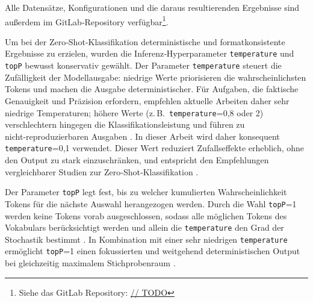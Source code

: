 Alle Datensätze, Konfigurationen und die daraus resultierenden
Ergebnisse sind außerdem im GitLab‑Repository verfügbar\footnote{Siehe das GitLab Repository: \hyperlink{https://gitlab.com/andreaskonrad/bpmn-gdpr-llm-evaluation}{// TODO}}.

Um bei der Zero‑Shot‑Klassifikation deterministische und formatkonsistente Ergebnisse zu erzielen, wurden die Inferenz‑Hyperparameter \texttt{temperature} und \texttt{topP} bewusst konservativ gewählt. Der Parameter \texttt{temperature} steuert die Zufälligkeit der Modellausgabe: niedrige Werte priorisieren die wahrscheinlichsten Tokens und machen die Ausgabe deterministischer. Für Aufgaben, die faktische Genauigkeit und Präzision erfordern, empfehlen aktuelle Arbeiten daher sehr niedrige Temperaturen; höhere Werte (z.\,B.\ \texttt{temperature}=0{,}8 oder 2) verschlechtern hingegen die Klassifikationsleistung und führen zu nicht‑reproduzierbaren Ausgaben \cite{renze2024effect,mu2024navigating}.
In dieser Arbeit wird daher konsequent \texttt{temperature}=0{,}1 verwendet. Dieser Wert reduziert Zufallseffekte erheblich, ohne den Output zu stark einzuschränken, und entspricht den Empfehlungen vergleichbarer Studien zur Zero‑Shot‑Klassifikation \cite{mu2024navigating}.

Der Parameter \texttt{topP} legt fest, bis zu welcher kumulierten Wahrscheinlichkeit Tokens für die nächste Auswahl herangezogen werden. Durch die Wahl \texttt{topP}=1 werden keine Tokens vorab ausgeschlossen, sodass alle möglichen Tokens des Vokabulars berücksichtigt werden und allein die \texttt{temperature} den Grad der Stochastik bestimmt \cite{renze2024effect}. In Kombination mit einer sehr niedrigen \texttt{temperature} ermöglicht \texttt{topP}=1 einen fokussierten und weitgehend deterministischen Output bei gleichzeitig maximalem Stichprobenraum \cite{mu2024navigating}.

